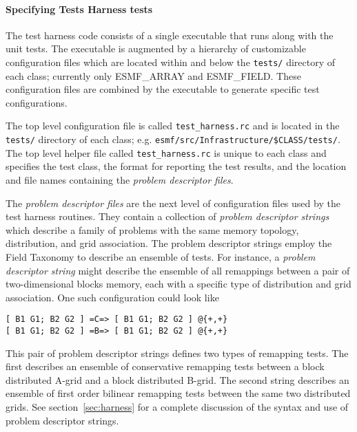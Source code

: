 \paragraph{Specifying Tests Harness tests}
The test harness code consists of a single executable that runs along with the
unit tests. The executable is augmented by a hierarchy of customizable configuration
files which are located within and below the \texttt{tests/} directory of each 
class; currently only ESMF\_ARRAY and ESMF\_FIELD. These configuration files are 
combined by the executable to generate specific test configurations. 

The top level configuration file is called \texttt{test\_harness.rc} and is located 
in the \texttt{tests/} directory of each class; e.g. 
\texttt{esmf/src/Infrastructure/\$CLASS/tests/}. The top level helper file called
\texttt{test\_harness.rc} is unique to each class and specifies the test class, the 
format for reporting the test results, and the location and file names containing 
the \textit{problem descriptor files}. 

The \textit{problem descriptor files} are the next level of configuration files
used by the test harness routines. They contain a collection of 
\textit{problem descriptor strings} which describe a family of problems with the 
same memory topology, distribution, and grid association. The problem descriptor 
strings employ the Field Taxonomy to describe an ensemble of tests. For instance, a
\textit{problem descriptor string} might describe the ensemble of all 
remappings between a pair of two-dimensional blocks memory, each with a  specific
type of distribution and grid association. One such configuration could look like

\begin{center}
\begin{verbatim}
[ B1 G1; B2 G2 ] =C=> [ B1 G1; B2 G2 ] @{+,+}
[ B1 G1; B2 G2 ] =B=> [ B1 G1; B2 G2 ] @{+,+} 
\end{verbatim}
\end{center}

This pair of problem descriptor strings defines two types of remapping tests.
The first describes an ensemble of conservative remapping tests between a 
block distributed A-grid and a block distributed B-grid. The second string describes
an ensemble of first order bilinear remapping tests between the same two 
distributed grids. See section~\ref{sec:harness} for a complete discussion of the 
syntax and use of problem descriptor strings.

